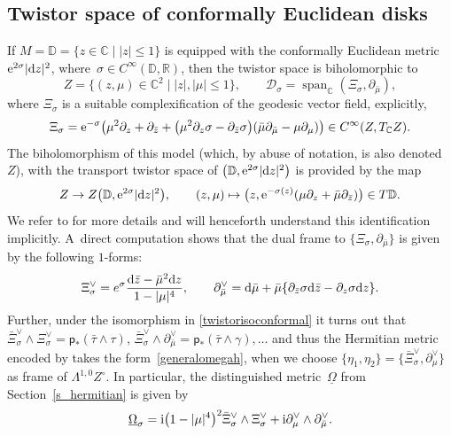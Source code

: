 \documentclass[10pt,a4paper]{amsart}
\numberwithin{equation}{section}
\theoremstyle{definition}
\newcommand{\R}{\mathbb{R}} %
\newcommand{\C}{\mathbb{C}} %
\newcommand{\DD}{\mathbb{D}} %
\newcommand{\1}{{\bf 1}}
\newcommand{\Om}{{\underline{\Omega}}}
\newcommand{\D}{\mathscr{D}}
\DeclareMathOperator{\spn}{span}
\begin{document}
\subsection{Twistor space of conformally Euclidean disks}\label{s_conformallyeuclidean}
If $M=\DD=\{z\in \C\mid |z|\le 1\}$ is equipped with the conformally Euclidean metric ${\rm e}^{2\sigma}|{\rm d}z|^2$, where~${\sigma\in C^\infty(\DD,\R)}$, then the twistor space is biholomorphic to
\[
	Z=\big\{(z,\mu)\in \C^2\mid |z|,|\mu|\le 1\big\},\qquad \D_\sigma = \spn_\C(\Xi_\sigma,\partial_{\bar \mu}),
\]
where $\Xi_\sigma$ is a suitable complexification of the geodesic vector field, explicitly,
\begin{equation}
	\Xi_\sigma={\rm e}^{-\sigma} \bigl(\mu^2\partial_z+\partial_{\bar z} + \bigl(\mu^2 \partial_z\sigma - \partial_{\bar z}\sigma\bigr)(\bar \mu \partial_{\bar \mu} - \mu \partial_\mu) \bigr) \in C^\infty(Z,T_\C Z).
	\label{Xisig}
\end{equation}
The biholomorphism of this model (which, by abuse of notation, is also denoted $Z$), with the transport twistor space of $\bigl(\DD,{\rm e}^{2\sigma} |{\rm d}z|^2\bigr)$ is provided by the map
\begin{equation}\label{twistorisoconformal}
	Z\rightarrow Z\bigl(\DD,{\rm e}^{2\sigma}|{\rm d}z|^2\bigr),\qquad (z,\mu)\mapsto \bigl(z,{\rm e}^{-\sigma(z)}(\mu\partial_z+\bar \mu \partial_{\bar z})\bigr)\in T\DD.
\end{equation}
We refer to \cite[Section~4.2]{BoPa23} for more details and will henceforth understand this identification implicitly. A~direct computation shows that the dual frame to $\{\Xi_\sigma,\partial_{\bar \mu}\}$ is given by the following $1$-forms:
\[%
	\Xi_\sigma^\vee = e^\sigma \frac{{\rm d}\bar z- \bar \mu^2 {\rm d}z}{1-|\mu|^4},\qquad \partial_{\bar\mu}^\vee = {\rm d}\bar \mu + \bar \mu\{\partial_{\bar z} \sigma {\rm d}\bar z - \partial_z \sigma {\rm d}z\}.
\]
Further, under the isomorphism in \eqref{twistorisoconformal} it turns out that $\bar \Xi_\sigma^\vee \wedge \Xi_\sigma^\vee = \mathsf{p}_*(\bar \tau\wedge \tau)$, $\bar \Xi_\sigma^\vee \wedge \partial_{\bar \mu}^\vee = \mathsf{p}_*(\bar \tau\wedge \gamma),\dots$ and thus the Hermitian metric encoded by  takes the form~\eqref{generalomegah}, when we choose $\{\eta_1,\eta_2\}=\{\bar {\Xi}^\vee_\sigma,\partial_\mu^\vee\}$ as frame of $\Lambda^{1,0}Z^\circ$. In particular, the distinguished metric~$\Om$ from Section~\ref{s_hermitian} is given by
\begin{equation}\label{def_omegasigma}
\Om_\sigma ={\rm i} \bigl(1-|\mu|^4\bigr)^2 \bar \Xi_\sigma^\vee \wedge \Xi_\sigma^\vee + {\rm i} \partial_\mu^\vee\wedge \partial_{\bar \mu}^\vee.
\end{equation}
\end{document}
